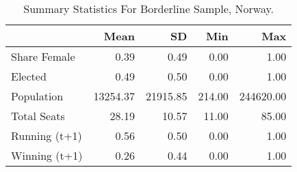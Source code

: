 \begin{table}

\caption{Summary Statistics For Borderline Sample, Norway.}
\centering
\begin{tabular}[t]{lrrrr}
\toprule
  & Mean & SD & Min & Max\\
\midrule
Share Female & 0.39 & 0.49 & 0.00 & 1.00\\
Elected & 0.49 & 0.50 & 0.00 & 1.00\\
Population & 13254.37 & 21915.85 & 214.00 & 244620.00\\
Total Seats & 28.19 & 10.57 & 11.00 & 85.00\\
Running (t+1) & 0.56 & 0.50 & 0.00 & 1.00\\
Winning (t+1) & 0.26 & 0.44 & 0.00 & 1.00\\
\bottomrule
\end{tabular}
\end{table}
